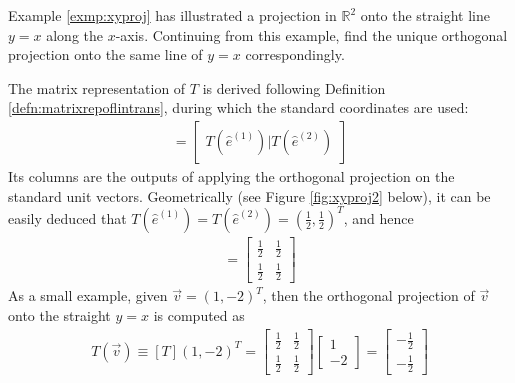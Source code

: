 \begin{exmp}
\label{exmp:xyproj2}
Example \ref{exmp:xyproj} has illustrated a projection in $\mathbb{R}^2$ onto the straight line $y = x$ along the $x$-axis. Continuing from this example, find the unique orthogonal projection onto the same line of $y = x$ correspondingly.
\end{exmp}
\begin{solution}
The matrix representation of $T$ is derived following Definition \ref{defn:matrixrepoflintrans}, during which the standard coordinates are used:
\begin{align*}
[T] =
\begin{bmatrix}
T(\hat{e}^{(1)})|T(\hat{e}^{(2)})
\end{bmatrix}
\end{align*}
Its columns are the outputs of applying the orthogonal projection on the standard unit vectors. Geometrically (see Figure \ref{fig:xyproj2} below), it can be easily deduced that $T(\hat{e}^{(1)}) = T(\hat{e}^{(2)}) = (\frac{1}{2}, \frac{1}{2})^T$, and hence
\begin{align*}
[T] =
\begin{bmatrix}
\frac{1}{2} & \frac{1}{2} \\
\frac{1}{2} & \frac{1}{2} 
\end{bmatrix}
\end{align*}
As a small example, given $\vec{v}=(1,-2)^T$, then the orthogonal projection of $\vec{v}$ onto the straight $y=x$ is computed as
\begin{align*}
T(\vec{v}) \equiv [T](1,-2)^T = 
\begin{bmatrix}
\frac{1}{2} & \frac{1}{2} \\
\frac{1}{2} & \frac{1}{2}     
\end{bmatrix}
\begin{bmatrix}
1 \\
-2
\end{bmatrix}
=
\begin{bmatrix}
-\frac{1}{2} \\
-\frac{1}{2}
\end{bmatrix}
\end{align*}
\end{solution}
